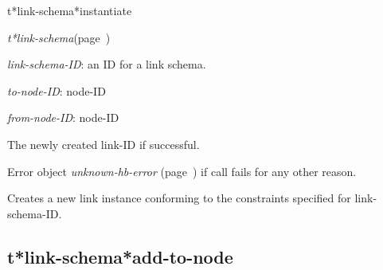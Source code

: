 \begin{description}
\item [Name:]  t*link-schema*instantiate

\item [Class:] {\sl t*link-schema}\hfill(page~\pageref{t*link-schema})

\item [Parameters:]
\item {\sl link-schema-ID}:  an ID for a link schema.

\item {\sl to-node-ID}:  node-ID


\item {\sl from-node-ID}:  node-ID


\item [Return-value:]
The newly created link-ID if successful.

Error object {\sl unknown-hb-error} (page~\pageref{unknown-hb-error}) if call fails for
any other reason.

\item [Description:]

Creates a new link instance conforming to the constraints
specified for link-schema-ID. 

\item [Public:]



\end{description}
\horizontalline

\subsection{t*link-schema*add-to-node}
\label{t*link-schema*add-to-node}

